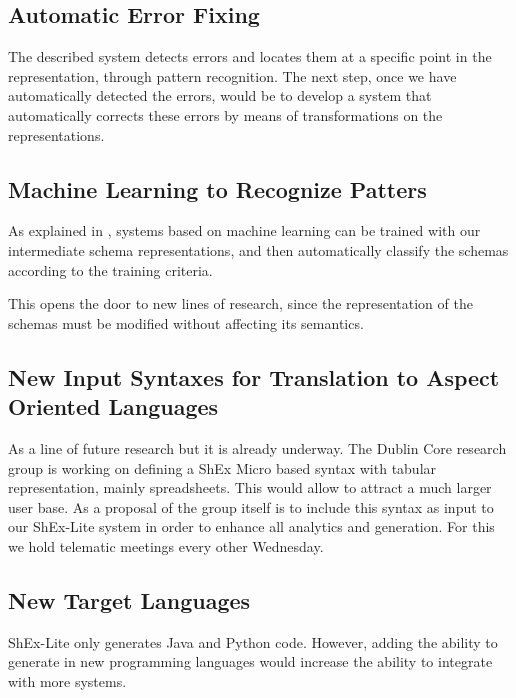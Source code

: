 \subsection{Automatic Error Fixing}
The described system detects errors and locates them at a specific point in the
representation, through pattern recognition. The next step, once we have automatically
detected the errors, would be to develop a system that automatically corrects these
errors by means of transformations on the representations.

\subsection{Machine Learning to Recognize Patters}
As explained in \cite{bigcode}, systems based on machine learning can be trained with
our intermediate schema representations, and then automatically classify the schemas
according to the training criteria.

This opens the door to new lines of research, since the representation of the
schemas must be modified without affecting its semantics.

\subsection{New Input Syntaxes for Translation to Aspect Oriented Languages}
As a line of future research but it is already underway. The Dublin Core research group
is working on defining a ShEx Micro based syntax with tabular representation, mainly
spreadsheets. This would allow to attract a much larger user base. As a proposal of
the group itself is to include this syntax as input to our ShEx-Lite system in order
to enhance all analytics and generation. For this we hold telematic meetings every
other Wednesday.

\subsection{New Target Languages}
ShEx-Lite only generates Java and Python code. However, adding the ability to generate
in new programming languages would increase the ability to integrate with more systems.